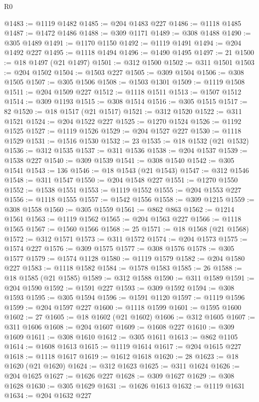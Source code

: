 \begin{lexlean}{R0}
\begin{coremodule}
@1483 := @1119 @1482
@1485 := @204 @1483 @227
@1486 := @1118 @1485
@1487 := @1472 @1486
@1488 := @309 @1171
@1489 := @308 @1488
@1490 := @305 @1489
@1491 := @1170 @1150
@1492 := @1119 @1491
@1494 := @204 @1492 @227
@1495 := @1118 @1494
@1496 := @1490 @1495
@1497 := 21
@1500 := @18 @1497 (@21 @1497)
@1501 := @312 @1500
@1502 := @311 @1501
@1503 := @204 @1502
@1504 := @1503 @227
@1505 := @309 @1504
@1506 := @308 @1505
@1507 := @305 @1506
@1508 := @1503 @1301
@1509 := @1119 @1508
@1511 := @204 @1509 @227
@1512 := @1118 @1511
@1513 := @1507 @1512
@1514 := @309 @1193
@1515 := @308 @1514
@1516 := @305 @1515
@1517 := 82
@1520 := @18 @1517 (@21 @1517)
@1521 := @312 @1520
@1522 := @311 @1521
@1524 := @204 @1522 @227
@1525 := @1270 @1524
@1526 := @1192 @1525
@1527 := @1119 @1526
@1529 := @204 @1527 @227
@1530 := @1118 @1529
@1531 := @1516 @1530
@1532 := 23
@1535 := @18 @1532 (@21 @1532)
@1536 := @312 @1535
@1537 := @311 @1536
@1538 := @204 @1537
@1539 := @1538 @227
@1540 := @309 @1539
@1541 := @308 @1540
@1542 := @305 @1541
@1543 := 136
@1546 := @18 @1543 (@21 @1543)
@1547 := @312 @1546
@1548 := @311 @1547
@1550 := @204 @1548 @227
@1551 := @1270 @1550
@1552 := @1538 @1551
@1553 := @1119 @1552
@1555 := @204 @1553 @227
@1556 := @1118 @1555
@1557 := @1542 @1556
@1558 := @309 @1215
@1559 := @308 @1558
@1560 := @305 @1559
@1561 := @862 @863
@1562 := @1214 @1561
@1563 := @1119 @1562
@1565 := @204 @1563 @227
@1566 := @1118 @1565
@1567 := @1560 @1566
@1568 := 25
@1571 := @18 @1568 (@21 @1568)
@1572 := @312 @1571
@1573 := @311 @1572
@1574 := @204 @1573
@1575 := @1574 @227
@1576 := @309 @1575
@1577 := @308 @1576
@1578 := @305 @1577
@1579 := @1574 @1128
@1580 := @1119 @1579
@1582 := @204 @1580 @227
@1583 := @1118 @1582
@1584 := @1578 @1583
@1585 := 26
@1588 := @18 @1585 (@21 @1585)
@1589 := @312 @1588
@1590 := @311 @1589
@1591 := @204 @1590
@1592 := @1591 @227
@1593 := @309 @1592
@1594 := @308 @1593
@1595 := @305 @1594
@1596 := @1591 @1120
@1597 := @1119 @1596
@1599 := @204 @1597 @227
@1600 := @1118 @1599
@1601 := @1595 @1600
@1602 := 27
@1605 := @18 @1602 (@21 @1602)
@1606 := @312 @1605
@1607 := @311 @1606
@1608 := @204 @1607
@1609 := @1608 @227
@1610 := @309 @1609
@1611 := @308 @1610
@1612 := @305 @1611
@1613 := @862 @1105
@1614 := @1608 @1613
@1615 := @1119 @1614
@1617 := @204 @1615 @227
@1618 := @1118 @1617
@1619 := @1612 @1618
@1620 := 28
@1623 := @18 @1620 (@21 @1620)
@1624 := @312 @1623
@1625 := @311 @1624
@1626 := @204 @1625
@1627 := @1626 @227
@1628 := @309 @1627
@1629 := @308 @1628
@1630 := @305 @1629
@1631 := @1626 @1613
@1632 := @1119 @1631
@1634 := @204 @1632 @227

\end{coremodule}
\end{lexlean}
